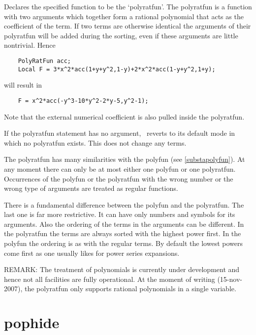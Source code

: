 \noindent Declares the specified function to be the 
`polyratfun'. The polyratfun is a function with two 
arguments which together form a rational polynomial that 
acts as the 
coefficient of the term. If two terms are otherwise 
identical the arguments of their polyratfun will be added during the sorting, 
even if these arguments are little nontrivial. Hence
\begin{verbatim}
    PolyRatFun acc;
    Local F = 3*x^2*acc(1+y+y^2,1-y)+2*x^2*acc(1-y+y^2,1+y);
\end{verbatim}
will result in
\begin{verbatim}
    F = x^2*acc(-y^3-10*y^2-2*y-5,y^2-1);
\end{verbatim}
Note that the external numerical coefficient is also 
pulled inside the polyratfun.

\noindent If the polyratfun statement has no argument, \FORM\ reverts to its 
default mode in which no polyratfun exists. This does not change any terms.

\noindent The polyratfun has many similarities with the polyfun (see 
\ref{substapolyfun}). At any moment there can only be at most either one 
polyfun or one polyratfun. Occurrences of the polyfun or the polyratfun 
with the wrong number or the wrong type of arguments are treated as regular 
functions.

\noindent There is a fundamental difference between the polyfun and the 
polyratfun. The last one is far more restrictive. It can have only numbers 
and symbols for its arguments. Also the ordering of the terms in the 
arguments can be different. In the polyratfun the terms are always sorted 
with the highest power first. In the polyfun the ordering is as with the 
regular terms. By default the lowest powers come first as one usually likes 
for power series expansions.

\noindent REMARK: The treatment of polynomials is currently under 
development and hence not all facilities are fully operational. At the 
moment of writing (15-nov-2007), the polyratfun only supports rational 
polynomials in a single variable.
\vspace{10mm}


\section{pophide}
\label{substapophide}


